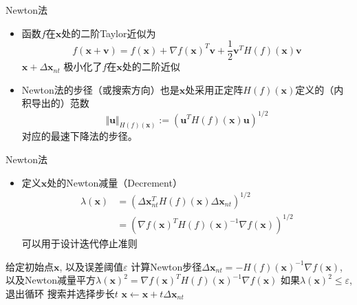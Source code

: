 \begin{frame}

\begin{block}{Newton法}
\begin{itemize}
\item 函数$f$在$\mathbf{x}$处的二阶Taylor近似为
$$f(\mathbf{x} + \mathbf{v}) = f(\mathbf{x}) + \nabla f(\mathbf{x})^T \mathbf{v} + \dfrac{1}{2} \mathbf{v}^T H(f)(\mathbf{x}) \mathbf{v}$$
$\mathbf{x} + \Delta \mathbf{x}_{nt}$ 极小化了$f$在$\mathbf{x}$处的二阶近似
\vspace{1em}
\item Newton法的步径（或搜索方向）也是$\mathbf{x}$处采用正定阵$H(f)(\mathbf{x})$定义的（内积导出的）范数
$$\Vert \mathbf{u} \Vert_{H(f)(\mathbf{x})} := (\mathbf{u}^T H(f)(\mathbf{x}) \mathbf{u})^{1/2}$$
对应的最速下降法的步径。
\end{itemize}
\end{block}

\end{frame}


\begin{frame}

\begin{block}{Newton法}
\begin{itemize}
\item 定义$\mathbf{x}$处的Newton减量（Decrement）
\begin{align*}
\lambda(\mathbf{x}) & = (\Delta \mathbf{x}_{nt}^T H(f)(\mathbf{x}) \Delta \mathbf{x}_{nt})^{1/2} \\
& = (\nabla f(\mathbf{x})^T H(f)(\mathbf{x})^{-1} \nabla f(\mathbf{x}))^{1/2}
\end{align*}
可以用于设计迭代停止准则
\end{itemize}
\end{block}

\end{frame}


\begin{frame}

\begin{algorithm}[H]
\SetAlgoLined
\DontPrintSemicolon
{}

给定初始点$\mathbf{x}$, 以及误差阈值$\varepsilon$ \;
{
计算Newton步径$\Delta \mathbf{x}_{nt} = - H(f)(\mathbf{x})^{-1} \nabla f(\mathbf{x})$, 以及Newton减量平方$\lambda(\mathbf{x})^2 = \nabla f(\mathbf{x})^T H(f)(\mathbf{x})^{-1} \nabla f(\mathbf{x})$\;
如果$\lambda(\mathbf{x})^2 \le \varepsilon$, 退出循环 \;
搜索并选择步长$t$ \;
$ \mathbf{x} \gets \mathbf{x} + t \Delta \mathbf{x}_{nt}$ \;
}
\caption{Newton法}
\end{algorithm}

\end{frame}

